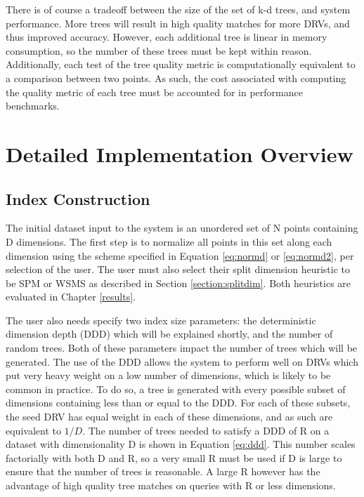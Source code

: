 There is of course a tradeoff between the size of the set of k-d trees, and system performance.  More trees will result in high quality matches for more DRVs, and thus improved accuracy.  However, each additional tree is linear in memory consumption, so the number of these trees must be kept within reason.  Additionally, each test of the tree quality metric is computationally equivalent to a comparison between two points.  As such, the cost associated with computing the quality metric of each tree must be accounted for in performance benchmarks.

\section{Detailed Implementation Overview}
\label{sec:myimpl}

\subsection{Index Construction}
\label{sec:myalgconst}

The initial dataset input to the system is an unordered set of N points containing D dimensions.  The first step is to normalize all points in this set along each dimension using the scheme specified in Equation \ref{eq:normd} or \ref{eq:normd2}, per selection of the user.  The user must also select their split dimension heuristic to be SPM or WSMS as described in Section \ref{section:splitdim}.  Both heuristics are evaluated in Chapter \ref{results}.

The user also needs specify two index size parameters: the deterministic dimension depth (DDD) which will be explained shortly, and the number of random trees.  Both of these parameters impact the number of trees which will be generated.  The use of the DDD allows the system to perform well on DRVs which put very heavy weight on a low number of dimensions, which is likely to be common in practice.  To do so, a tree is generated with every possible subset of dimensions containing less than or equal to the DDD.  For each of these subsets, the seed DRV has equal weight in each of these dimensions, and as such are equivalent to $1/D$.  The number of trees needed to satisfy a DDD of R on a dataset with dimensionality D is shown in Equation \ref{eq:ddd}.  This number scales factorially with both D and R, so a very small R must be used if D is large to ensure that the number of trees is reasonable.  A large R however has the advantage of high quality tree matches on queries with R or less dimensions.

